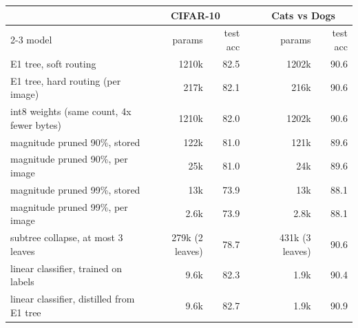 \begin{tabular}{lrrrrr}
\toprule
 & \multicolumn{2}{c}{CIFAR-10} & & \multicolumn{2}{c}{Cats vs Dogs} \\
\cmidrule{2-3}\cmidrule{5-6}
model & params & test acc & & params & test acc \\
\midrule
E1 tree, soft routing & 1210k & 82.5 & & 1202k & 90.6 \\
E1 tree, hard routing (per image) & 217k & 82.1 & & 216k & 90.6 \\
int8 weights (same count, 4x fewer bytes) & 1210k & 82.0 & & 1202k & 90.6 \\
magnitude pruned 90\%, stored & 122k & 81.0 & & 121k & 89.6 \\
magnitude pruned 90\%, per image & 25k & 81.0 & & 24k & 89.6 \\
magnitude pruned 99\%, stored & 13k & 73.9 & & 13k & 88.1 \\
magnitude pruned 99\%, per image & 2.6k & 73.9 & & 2.8k & 88.1 \\
subtree collapse, at most 3 leaves & 279k (2 leaves) & 78.7 & & 431k (3 leaves) & 90.6 \\
linear classifier, trained on labels & 9.6k & 82.3 & & 1.9k & 90.4 \\
linear classifier, distilled from E1 tree & 9.6k & 82.7 & & 1.9k & 90.9 \\
\bottomrule
\end{tabular}
